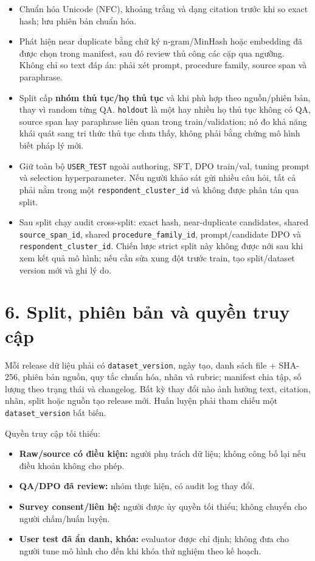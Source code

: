 \documentclass[11pt,a4paper]{article}
\providecommand{\tightlist}{\setlength{\itemsep}{0pt}\setlength{\parskip}{0pt}}
\begin{document}
\begin{itemize}
\tightlist
\item
  Chuẩn hóa Unicode (NFC), khoảng trắng và dạng citation trước khi so
  exact hash; lưu phiên bản chuẩn hóa.
\item
  Phát hiện near duplicate bằng chữ ký n-gram/MinHash hoặc embedding đã
  được chọn trong manifest, sau đó review thủ công các cặp qua ngưỡng.
  Không chỉ so text đáp án: phải xét prompt, procedure family, source
  span và paraphrase.
\item
  Split cấp \textbf{nhóm thủ tục/họ thủ tục} và khi phù hợp theo
  nguồn/phiên bản, thay vì random từng QA. \nolinkurl{holdout} là một
  hay nhiều họ thủ tục không có QA, source span hay paraphrase liên quan
  trong train/validation; nó đo khả năng khái quát sang tri thức thủ tục
  chưa thấy, không phải bằng chứng mô hình biết pháp lý mới.
\item
  Giữ toàn bộ \nolinkurl{USER_TEST} ngoài authoring, SFT, DPO train/val,
  tuning prompt và selection hyperparameter. Nếu người khảo sát gửi
  nhiều câu hỏi, tất cả phải nằm trong một
  \nolinkurl{respondent_cluster_id} và không được phân tán qua split.
\item
  Sau split chạy audit cross-split: exact hash, near-duplicate
  candidates, shared \nolinkurl{source_span_id}, shared
  \nolinkurl{procedure_family_id}, prompt/candidate DPO và
  \nolinkurl{respondent_cluster_id}. Chiến lược strict split này không
  được nới sau khi xem kết quả mô hình; nếu cần sửa xung đột trước
  train, tạo split/dataset version mới và ghi lý do.
\end{itemize}

\section{6. Split, phiên bản và quyền truy
cập}\label{split-phiuxean-bux1ea3n-vuxe0-quyux1ec1n-truy-cux1eadp}

Mỗi release dữ liệu phải có \nolinkurl{dataset_version}, ngày tạo, danh
sách file + SHA-256, phiên bản nguồn, quy tắc chuẩn hóa, nhãn và rubric;
manifest chia tập, số lượng theo trạng thái và changelog. Bất kỳ thay
đổi nào ảnh hưởng text, citation, nhãn, split hoặc nguồn tạo release
mới. Huấn luyện phải tham chiếu một \nolinkurl{dataset_version} bất
biến.

Quyền truy cập tối thiểu:

\begin{itemize}
\tightlist
\item
  \textbf{Raw/source có điều kiện:} người phụ trách dữ liệu; không công
  bố lại nếu điều khoản không cho phép.
\item
  \textbf{QA/DPO đã review:} nhóm thực hiện, có audit log thay đổi.
\item
  \textbf{Survey consent/liên hệ:} người được ủy quyền tối thiểu; không
  chuyển cho người chấm/huấn luyện.
\item
  \textbf{User test đã ẩn danh, khóa:} evaluator được chỉ định; không
  đưa cho người tune mô hình cho đến khi khóa thử nghiệm theo kế hoạch.
\end{itemize}
\end{document}
